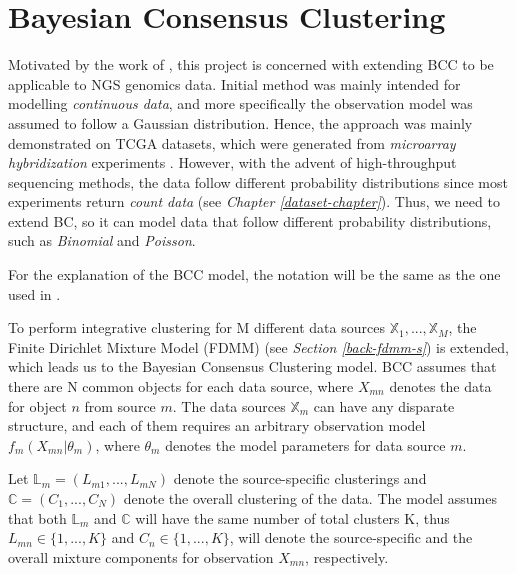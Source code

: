 \section{Bayesian Consensus Clustering} \label{integr-bcc-sect}
Motivated by the work of \citet{Lock2013}, this project is concerned with extending BCC to be applicable to NGS genomics data. Initial method was mainly intended for modelling \emph{continuous data}, and more specifically the observation model was assumed to follow a Gaussian distribution. Hence, the approach was mainly demonstrated on TCGA datasets, which were generated from \emph{microarray hybridization} experiments \citep{Babu2004}. However, with the advent of high-throughput sequencing methods, the data follow different probability distributions since most experiments return \emph{count data} (see \emph{Chapter \ref{dataset-chapter}}). Thus, we need to extend BC, so it can model data that follow different probability distributions, such as \emph{Binomial} and \emph{Poisson}.

For the explanation of the BCC model, the notation will be the same as the one used in \citet{Lock2013}. 

To perform integrative clustering for M different data sources $\mathbb{X}_{1},..., \mathbb{X}_{M}$, the Finite Dirichlet Mixture Model (FDMM) (see \emph{Section \ref{back-fdmm-s}}) is extended, which leads us to the Bayesian Consensus Clustering model. BCC assumes that there are N common objects for each data source, where $X_{mn}$ denotes the data for object $n$ from source $m$. The data sources $\mathbb{X}_{m}$ can have any disparate structure, and each of them requires an arbitrary observation model $f_{m}(X_{mn}|\theta_{m})$, where $\theta_{m}$ denotes the model parameters for data source $m$.

Let $\mathbb{L}_{m} = (L_{m1},...,L_{mN})$ denote the source-specific clusterings and $\mathbb{C} = (C_{1},...,C_{N})$ denote the overall clustering of the data. The model assumes that both $\mathbb{L}_{m}$ and $\mathbb{C}$ will have the same number of total clusters K, thus $L_{mn} \in \lbrace 1,...,K \rbrace$ and $C_{n} \in \lbrace 1,...,K \rbrace$, will denote the source-specific and the overall mixture components for observation $X_{mn}$, respectively.

